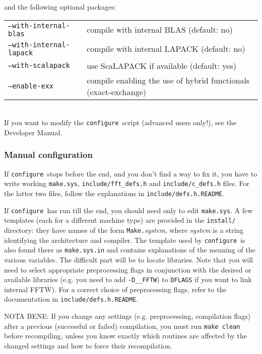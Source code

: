 \documentclass[12pt,a4paper]{article}
\def\configure{\texttt{configure}}
\begin{document}
and the following optional packages:\\
\begin{tabular}{ll}
\texttt{--with-internal-blas}&    compile with internal BLAS (default: no)\\
\texttt{--with-internal-lapack}&  compile with internal LAPACK (default: no)\\
\texttt{--with-scalapack}&        use ScaLAPACK if available (default: yes)\\
\texttt{--enable-exx}&            compile enabling the use of hybrid functionals (exact-exchange)\\
\end{tabular}\\
If you want to modify the \configure\ script (advanced users only!), 
see the Developer Manual.

\subsubsection{Manual configuration}
\label{SubSec:manconf}
If \configure\ stops before the end, and you don't find a way to fix
it, you have to write working \texttt{make.sys}, \texttt{include/fft\_defs.h}
and \texttt{include/c\_defs.h} files. 
For the latter two files, follow the explanations in 
\texttt{include/defs.h.README}.

If \configure\ has run till the end, you should need only to
edit \texttt{make.sys}. A few templates (each for a different 
machine type)
are provided in the \texttt{install/} directory: they have names of the
form \texttt{Make.}{\em system}, where {\em system} is a string identifying the 
architecture and compiler. The template used by \configure\ is also found
there as \texttt{make.sys.in} and contains explanations of the meaning
of the various variables. The difficult part will be to locate libraries.
Note that you will need to select appropriate preprocessing flags
in conjunction with the desired or available
libraries (e.g. you need to add \texttt{-D\_\_FFTW}) to \texttt{DFLAGS}
if you want to link internal FFTW). For a correct choice of preprocessing 
flags, refer to the documentation in \texttt{include/defs.h.README}.

NOTA BENE: If you change any settings (e.g. preprocessing,
compilation flags) 
after a previous (successful or failed) compilation, you must run 
\texttt{make clean} before recompiling, unless you know exactly which 
routines are affected by the changed settings and how to force their recompilation.
\end{document}
